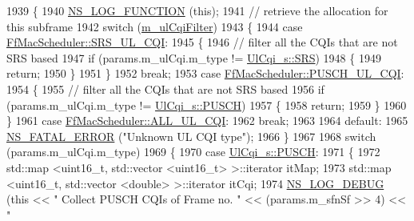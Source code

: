 \begin{DoxyCode}
1939 \{
1940   \hyperlink{log-macros-disabled_8h_a90b90d5bad1f39cb1b64923ea94c0761}{NS\_LOG\_FUNCTION} (\textcolor{keyword}{this});
1941 \textcolor{comment}{// retrieve the allocation for this subframe}
1942   \textcolor{keywordflow}{switch} (\hyperlink{classns3_1_1FfMacScheduler_adae16e66a1c4231da80a1221297442cf}{m\_ulCqiFilter})
1943     \{
1944     \textcolor{keywordflow}{case} \hyperlink{classns3_1_1FfMacScheduler_aa47a9eb25f2c558c825b0be645304a52af2e0df473ba2c8f9cb131cb760591aed}{FfMacScheduler::SRS\_UL\_CQI}:
1945       \{
1946         \textcolor{comment}{// filter all the CQIs that are not SRS based}
1947         \textcolor{keywordflow}{if} (params.m\_ulCqi.m\_type != \hyperlink{structns3_1_1UlCqi__s_aece9e5ebea42eb9ff1744c72c8459b57af4b6dba4243636562c910c4d4761dd7e}{UlCqi\_s::SRS})
1948           \{
1949             \textcolor{keywordflow}{return};
1950           \}
1951       \}
1952       \textcolor{keywordflow}{break};
1953     \textcolor{keywordflow}{case} \hyperlink{classns3_1_1FfMacScheduler_aa47a9eb25f2c558c825b0be645304a52a4a833bc779439b15bd904e1dd8eaa563}{FfMacScheduler::PUSCH\_UL\_CQI}:
1954       \{
1955         \textcolor{comment}{// filter all the CQIs that are not SRS based}
1956         \textcolor{keywordflow}{if} (params.m\_ulCqi.m\_type != \hyperlink{structns3_1_1UlCqi__s_aece9e5ebea42eb9ff1744c72c8459b57a9716b20a3095c473ae3fde1eb5d0bb63}{UlCqi\_s::PUSCH})
1957           \{
1958             \textcolor{keywordflow}{return};
1959           \}
1960       \}
1961     \textcolor{keywordflow}{case} \hyperlink{classns3_1_1FfMacScheduler_aa47a9eb25f2c558c825b0be645304a52a84059a597c72335f0a5963c3efcbda71}{FfMacScheduler::ALL\_UL\_CQI}:
1962       \textcolor{keywordflow}{break};
1963 
1964     \textcolor{keywordflow}{default}:
1965       \hyperlink{group__fatal_ga5131d5e3f75d7d4cbfd706ac456fdc85}{NS\_FATAL\_ERROR} (\textcolor{stringliteral}{"Unknown UL CQI type"});
1966     \}
1967 
1968   \textcolor{keywordflow}{switch} (params.m\_ulCqi.m\_type)
1969     \{
1970     \textcolor{keywordflow}{case} \hyperlink{structns3_1_1UlCqi__s_aece9e5ebea42eb9ff1744c72c8459b57a9716b20a3095c473ae3fde1eb5d0bb63}{UlCqi\_s::PUSCH}:
1971       \{
1972         std::map <uint16\_t, std::vector <uint16\_t> >::iterator itMap;
1973         std::map <uint16\_t, std::vector <double> >::iterator itCqi;
1974         \hyperlink{group__logging_ga413f1886406d49f59a6a0a89b77b4d0a}{NS\_LOG\_DEBUG} (\textcolor{keyword}{this} << \textcolor{stringliteral}{" Collect PUSCH CQIs of Frame no. "} << (params.m\_sfnSf >> 4) << \textcolor{stringliteral}{"
}
\end{DoxyCode}
